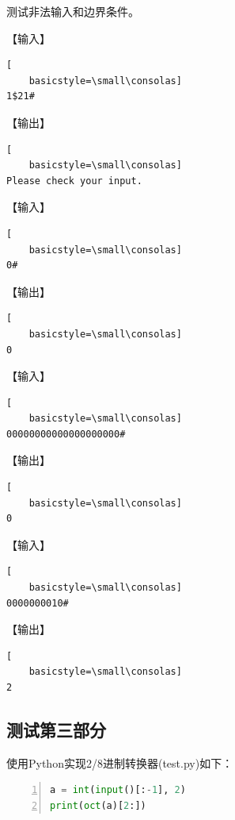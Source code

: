 \documentclass{article}
\begin{document}
测试非法输入和边界条件。

【输入】

\begin{lstlisting}[
    basicstyle=\small\consolas]
1$21#
\end{lstlisting}

【输出】

\begin{lstlisting}[
    basicstyle=\small\consolas]
Please check your input.
\end{lstlisting}

【输入】

\begin{lstlisting}[
    basicstyle=\small\consolas]
0#
\end{lstlisting}

【输出】

\begin{lstlisting}[
    basicstyle=\small\consolas]
0
\end{lstlisting}

【输入】

\begin{lstlisting}[
    basicstyle=\small\consolas]
00000000000000000000#
\end{lstlisting}

【输出】

\begin{lstlisting}[
    basicstyle=\small\consolas]
0
\end{lstlisting}

【输入】

\begin{lstlisting}[
    basicstyle=\small\consolas]
0000000010#
\end{lstlisting}

【输出】

\begin{lstlisting}[
    basicstyle=\small\consolas]
2
\end{lstlisting}

\subsection{测试第三部分}

使用Python实现2/8进制转换器(test.py)如下：

\begin{lstlisting}[language={Python},
    numbers=left,
    numberstyle=\tiny\consolas,
    basicstyle=\small\consolas]
a = int(input()[:-1], 2)
print(oct(a)[2:])
\end{lstlisting}
\end{document}
